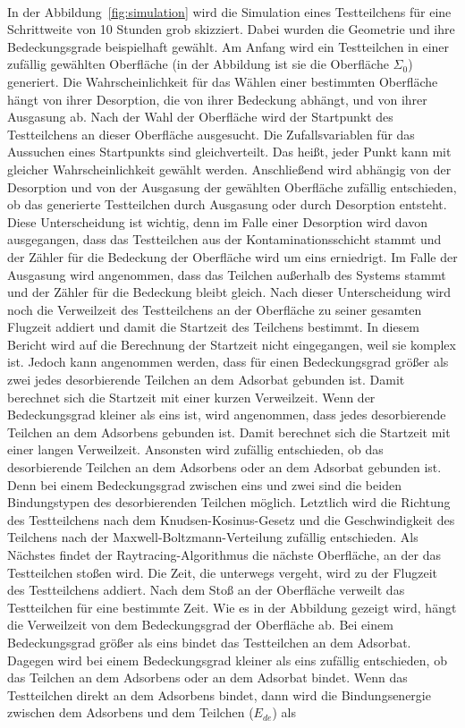 \documentclass{listhesis}
\begin{document}
\paragraph{}
In der Abbildung~\ref{fig:simulation} wird die Simulation eines Testteilchens für eine Schrittweite von 10 Stunden grob skizziert. Dabei wurden die Geometrie und ihre Bedeckungsgrade beispielhaft gewählt. Am Anfang wird ein Testteilchen in einer zufällig gewählten Oberfläche (in der Abbildung ist sie die Oberfläche $\Sigma_0$) generiert. Die Wahrscheinlichkeit für das Wählen einer bestimmten Oberfläche hängt von ihrer Desorption, die von ihrer Bedeckung abhängt, und von ihrer Ausgasung ab. Nach der Wahl der Oberfläche wird der Startpunkt des Testteilchens an dieser Oberfläche ausgesucht. Die Zufallsvariablen für das Aussuchen eines Startpunkts sind gleichverteilt. Das heißt, jeder Punkt kann mit gleicher Wahrscheinlichkeit gewählt werden. Anschließend wird abhängig von der Desorption und von der Ausgasung der gewählten Oberfläche zufällig entschieden, ob das generierte Testteilchen durch Ausgasung oder durch Desorption entsteht. Diese Unterscheidung ist wichtig, denn im Falle einer Desorption wird davon ausgegangen, dass das Testteilchen aus der Kontaminationsschicht stammt und der Zähler für die Bedeckung der Oberfläche wird um eins erniedrigt. Im Falle der Ausgasung wird angenommen, dass das Teilchen außerhalb des Systems stammt und der Zähler für die Bedeckung bleibt gleich. Nach dieser Unterscheidung wird noch die Verweilzeit des Testteilchens an der Oberfläche zu seiner gesamten Flugzeit addiert und damit die Startzeit des Teilchens bestimmt. In diesem Bericht wird auf die Berechnung der Startzeit nicht eingegangen, weil sie komplex ist. Jedoch kann angenommen werden, dass für einen Bedeckungsgrad größer als zwei jedes desorbierende Teilchen an dem Adsorbat gebunden ist. Damit berechnet sich die Startzeit mit einer kurzen Verweilzeit. Wenn der Bedeckungsgrad kleiner als eins ist, wird angenommen, dass jedes desorbierende Teilchen an dem Adsorbens gebunden ist. Damit berechnet sich die Startzeit mit einer langen Verweilzeit. Ansonsten wird zufällig entschieden, ob das desorbierende Teilchen an dem Adsorbens oder an dem Adsorbat gebunden ist. Denn bei einem Bedeckungsgrad zwischen eins und zwei sind die beiden Bindungstypen des desorbierenden Teilchen möglich. Letztlich wird die Richtung des Testteilchens nach dem Knudsen-Kosinus-Gesetz und die Geschwindigkeit des Teilchens nach der Maxwell-Boltzmann-Verteilung zufällig entschieden. Als Nächstes findet der Raytracing-Algorithmus die nächste Oberfläche, an der das Testteilchen stoßen wird. Die Zeit, die unterwegs vergeht, wird zu der Flugzeit des Testteilchens addiert. Nach dem Stoß an der Oberfläche verweilt das Testteilchen für eine bestimmte Zeit. Wie es in der Abbildung gezeigt wird, hängt die Verweilzeit von dem Bedeckungsgrad der Oberfläche ab. Bei einem Bedeckungsgrad größer als eins bindet das Testteilchen an dem Adsorbat. Dagegen wird bei einem Bedeckungsgrad kleiner als eins zufällig entschieden, ob das Teilchen an dem Adsorbens oder an dem Adsorbat bindet. Wenn das Testteilchen direkt an dem Adsorbens bindet, dann wird die Bindungsenergie zwischen dem Adsorbens und dem Teilchen ($E_{de}$) als 
\end{document}
